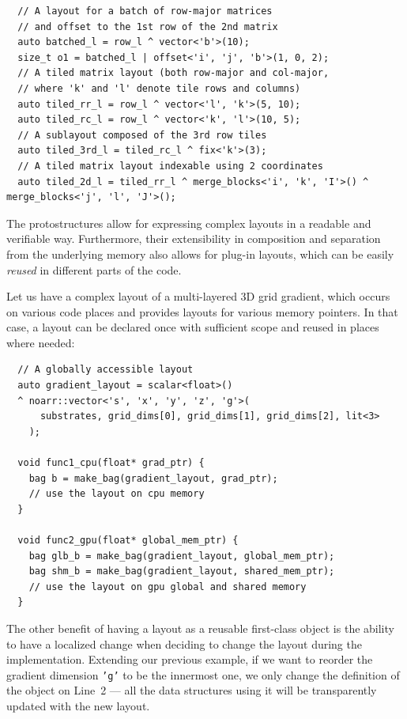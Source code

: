   \begin{verbatim}
  // A layout for a batch of row-major matrices
  // and offset to the 1st row of the 2nd matrix
  auto batched_l = row_l ^ vector<'b'>(10);
  size_t o1 = batched_l | offset<'i', 'j', 'b'>(1, 0, 2);
  // A tiled matrix layout (both row-major and col-major, 
  // where 'k' and 'l' denote tile rows and columns)
  auto tiled_rr_l = row_l ^ vector<'l', 'k'>(5, 10);
  auto tiled_rc_l = row_l ^ vector<'k', 'l'>(10, 5);
  // A sublayout composed of the 3rd row tiles 
  auto tiled_3rd_l = tiled_rc_l ^ fix<'k'>(3);
  // A tiled matrix layout indexable using 2 coordinates
  auto tiled_2d_l = tiled_rr_l ^ merge_blocks<'i', 'k', 'I'>() ^ merge_blocks<'j', 'l', 'J'>();
  \end{verbatim}
  
The protostructures allow for expressing complex layouts in a readable and verifiable way. Furthermore, their extensibility in composition and separation from the underlying memory also allows for plug-in layouts, which can be easily \emph{reused} in different parts of the code.

Let us have a complex layout of a multi-layered 3D grid gradient, which occurs on various code places and provides layouts for various memory pointers. In that case, a layout can be declared once with sufficient scope and reused in places where needed:
\begin{verbatim}
  // A globally accessible layout
  auto gradient_layout = scalar<float>() 
  ^ noarr::vector<'s', 'x', 'y', 'z', 'g'>(
      substrates, grid_dims[0], grid_dims[1], grid_dims[2], lit<3>
    );

  void func1_cpu(float* grad_ptr) {
    bag b = make_bag(gradient_layout, grad_ptr);
    // use the layout on cpu memory
  }
  
  void func2_gpu(float* global_mem_ptr) {
    bag glb_b = make_bag(gradient_layout, global_mem_ptr);
    bag shm_b = make_bag(gradient_layout, shared_mem_ptr);
    // use the layout on gpu global and shared memory
  }
\end{verbatim}

The other benefit of having a layout as a reusable first-class object is the ability to have a localized change when deciding to change the layout during the implementation. Extending our previous example, if we want to reorder the gradient dimension \texttt{'g'} to be the innermost one, we only change the definition of the object on Line~2 --- all the data structures using it will be transparently updated with the new layout.


